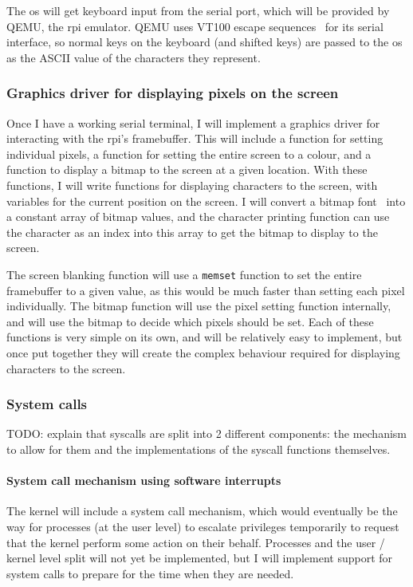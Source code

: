 \documentclass{article}
\begin{document}
The \gls{os} will get keyboard input from the serial port, which will be
provided by QEMU, the \gls{rpi} emulator. QEMU uses VT100 escape
sequences~\cite{vt100} for its serial interface, so normal keys on the keyboard
(and shifted keys) are passed to the \gls{os} as the ASCII value of the
characters they represent.

\subsubsection{Graphics driver for displaying pixels on the screen}
\label{sec:design_graphics_driver}
Once I have a working serial terminal, I will implement a graphics driver for
interacting with the \gls{rpi}'s framebuffer. This will include a function for
setting individual pixels, a function for setting the entire screen to a
colour, and a function to display a bitmap to the screen at a given location.
With these functions, I will write functions for displaying characters to the
screen, with variables for the current position on the screen. I will convert a
bitmap font~\cite{bizcat-font} into a constant array of bitmap values, and the
character printing function can use the character as an index into this array
to get the bitmap to display to the screen.

The screen blanking function will use a \texttt{memset} function to set the
entire framebuffer to a given value, as this would be much faster than setting
each pixel individually. The bitmap function will use the pixel setting
function internally, and will use the bitmap to decide which pixels should be
set. Each of these functions is very simple on its own, and will be relatively
easy to implement, but once put together they will create the complex behaviour
required for displaying characters to the screen.

\subsubsection{System calls}
TODO: explain that syscalls are split into 2 different components: the
mechanism to allow for them and the implementations of the syscall functions
themselves.

\paragraph{System call mechanism using software interrupts}
The kernel will include a system call mechanism, which would eventually be the
way for processes (at the user level) to escalate privileges temporarily to
request that the kernel perform some action on their behalf. Processes and the
user / kernel level split will not yet be implemented, but I will implement
support for system calls to prepare for the time when they are needed.
\end{document}
